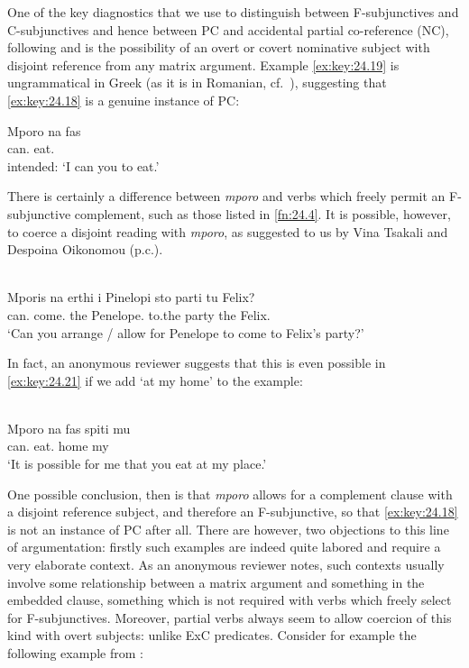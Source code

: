 \documentclass[output=paper]{langsci/langscibook}
\begin{document}
One of the key diagnostics that we use to distinguish between F-subjunctives
and C-subjunctives and hence between \gls{PC} and
accidental partial co-reference (NC), following \citet{Varlokosta1994} and
\citet{Landau2004} is the possibility of an overt or covert
nominative subject with disjoint reference from any matrix
argument. Example \eqref{ex:key:24.19} is ungrammatical in Greek (as it is in
Romanian, cf.\ ), suggesting that \eqref{ex:key:24.18} is a
genuine instance of PC:

\ea%
    \label{ex:key:24.19} 
	\gll \llap{*}Mporo   na   fas\\
        can.\Fsg{}  \Sbjv{}   eat.\Ssg{}\\
    \glt intended: ‘I can you to eat.’
\z

There is certainly a difference between \emph{mporo} and verbs which freely
permit an F-subjunctive complement, such as those listed in \cref{fn:24.4}. It
is possible, however, to coerce a disjoint reading with \emph{mporo}, as
suggested to us by Vina Tsakali and Despoina Oikonomou (p.c.).

\ea%
    \label{ex:key:24.20}\\
	\gll Mporis  na   erthi     i Pinelopi     sto   parti   tu  Felix?\\
		can.\Ssg{} \Sbjv{}   come.\Tsg{}   the Penelope.\Nom{}      to.the   party   the Felix.\Gen{}\\
	\glt ‘Can you arrange / allow for Penelope to come to Felix’s party?’
\z

In fact, an anonymous reviewer suggests that this is even possible in
\eqref{ex:key:24.21} if we add ‘at my home’ to the example:

\ea%
    \label{ex:key:24.21}\\
	\gll Mporo   na   fas   spiti mu\\
    can.\Fsg{}   \Sbjv{}   eat.\Ssg{}  home my\\
	\glt ‘It is possible for me that you eat at my place.’
\z

One possible conclusion, then is that \emph{mporo} allows for a complement
clause with a disjoint reference subject, and therefore an F-subjunctive, so
that \eqref{ex:key:24.18} is not an instance of \gls{PC} after all.
There are however, two objections to this line of argumentation: firstly such
examples are indeed quite labored and require a very elaborate context. As an
anonymous reviewer notes, such contexts usually involve some relationship
between a matrix argument and something in the embedded clause, something which
is not required with verbs which freely select for F-subjunctives. Moreover,
partial  verbs always seem to allow coercion of this kind with overt
subjects: unlike \gls{ExC} predicates. Consider
for example the following example from :
\end{document}
